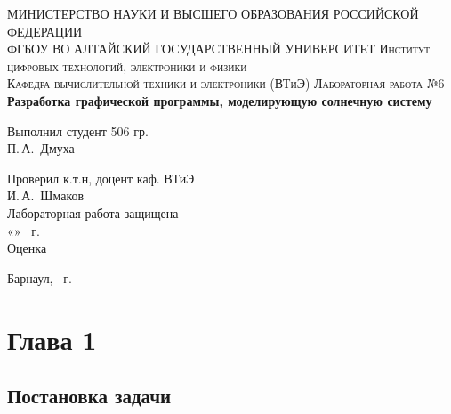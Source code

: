 \documentclass[12pt,a4paper]{extarticle}
\begin{document}
\begin{titlepage}
\begin{center}
\MakeUppercase{Министерство науки и высшего образования Российской Федерации} \\
\MakeUppercase{ФГБОУ ВО АЛТАЙСКИЙ ГОСУДАРСТВЕННЫЙ УНИВЕРСИТЕТ}
\vfill
\textsc{Институт цифровых технологий, электроники и физики} \\

\textsc{Кафедра вычислительной техники и электроники (ВТиЭ)}
\vfill
\textsc{Лабораторная работа №6} \\
\textbf{Разработка графической программы, моделирующую солнечную систему}
\bigskip

\end{center}
\vfill

\newlength{\ML}
\hfill\begin{minipage}{0.5\textwidth}
Выполнил студент 506 гр.\\
\underline{\hspace{4cm}} П.\,А.~Дмуха\\
\end{minipage}%

\hfill\begin{minipage}{0.5\textwidth}
Проверил к.т.н, доцент каф. ВТиЭ\\
\underline{\hspace{4cm}} И.\,А.~Шмаков\\
Лабораторная работа защищена\\
«\underline{\hspace{0.7cm}}» \underline{\hspace{4cm}} \the\year~г. \\
Оценка \underline{\hspace{3.6cm}}
\end{minipage}%
\vfill

\begin{center}
Барнаул, \the\year~г.
\end{center}
\end{titlepage}

\section{Глава 1}
\subsection{Постановка задачи}
\end{document}
